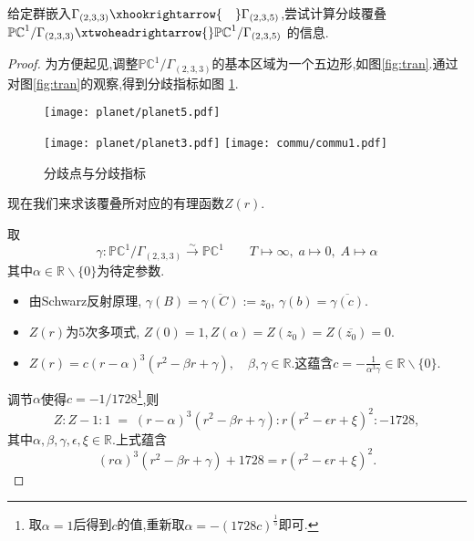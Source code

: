 \begin{exercise}
	给定群嵌入$\Gamma_{(2,3,3)}\xhookrightarrow{\quad}\Gamma_{(2,3,5)}$,尝试计算分歧覆叠$\mathbb{PC}^1/\Gamma_{(2,3,3)}\xtwoheadrightarrow{}\mathbb{PC}^1/\Gamma_{(2,3,5)}$ 的信息.
\end{exercise}
\begin{proof}
	为方便起见,调整$\mathbb{PC}^1/\Gamma_{(2,3,3)}$的基本区域为一个五边形,如图\ref{fig:tran}.通过对图\ref{fig:tran}的观察,得到分歧指标如图
	\ref{fig:ramify1}.
	
	
	
	\begin{figure}[ht]
		\begin{minipage}[t]{.25\textwidth}
			\vspace{0cm}
			\centering
			\texttt{[image: planet/planet5.pdf]}
			\caption{}
			\label{fig:tran}
		\end{minipage}
		\begin{minipage}[t]{.65\textwidth}
			\vspace{0cm}
			\centering
			\texttt{[image: planet/planet3.pdf]}
			\texttt{[image: commu/commu1.pdf]}
			\caption{分歧点与分歧指标}
			\label{fig:ramify1}
		\end{minipage}
		
	\end{figure}
	
	
	
	
	
	现在我们来求该覆叠所对应的有理函数$Z(r)$.
	
	取
	$$\gamma:\mathbb{PC}^1/\Gamma_{(2,3,3)}\overset{\sim}{\longrightarrow}\mathbb{PC}^1\qquad T\longmapsto\infty,\;a\longmapsto0,\;A\longmapsto\alpha$$ 其中$\alpha\in\mathbb{R}\smallsetminus\{0\}$为待定参数.
	\begin{itemize}
		\item 由Schwarz反射原理, $\gamma(B)=\overline{\gamma(C)}:=z_0$, $\gamma(b)=\overline{\gamma(c)}$.
		\item $Z(r)$为5次多项式, $Z(0)=1,Z(\alpha)=Z(z_0)=Z(\overline{z_0})=0$.
		
		\item $Z(r)=c(r-\alpha)^3(r^2-\beta r+\gamma),\quad\beta,\gamma\in\mathbb{R}$.这蕴含$c=-\frac{1}{\alpha^3\gamma}\in\mathbb{R} \smallsetminus \{0\}$.
	\end{itemize}
	
	调节$\alpha$使得$c=-1/1728$\footnote{取$\alpha=1$后得到$c$的值,重新取$\alpha=-(1728c)^{\frac{1}{5}}$即可.},则
	$$Z:Z-1:1\;=\;(r-\alpha)^3(r^2-\beta r+\gamma):r(r^2-\epsilon r+\xi)^2:-1728,$$
	其中$\alpha,\beta,\gamma,\epsilon,\xi\in\mathbb{R}$.上式蕴含
	\begin{equation}
	(r\alpha)^3(r^2-\beta r+\gamma)+1728=r(r^2-\epsilon r+\xi)^2.
	\end{equation}
	

\end{proof}
